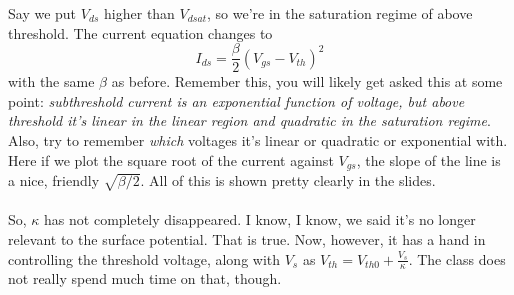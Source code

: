 \documentclass[main]{subfiles}
\begin{document}
Say we put $V_{ds}$ higher than $V_{dsat}$, so we're in the saturation regime of above threshold. The current equation changes to
\begin{equation}
I_{ds} = \frac{\beta}{2}(V_{gs} - V_{th})^2
\label{abvSatEqn}
\end{equation}
with the same $\beta$ as before. Remember this, you will likely get asked this at some point: \textsl{subthreshold current is an exponential function of voltage, but above threshold it's linear in the linear region and \emph{quadratic} in the saturation regime}. Also, try to remember \emph{which} voltages it's linear or quadratic or exponential with. Here if we plot the square root of the current against $V_{gs}$, the slope of the line is a nice, friendly $\sqrt{\beta/2}$. All of this is shown pretty clearly in the slides.\\ \\
So, $\kappa$ has not completely disappeared. I know, I know, we said it's no longer relevant to the surface potential. That is true. Now, however, it has a hand in controlling the threshold voltage, along with $V_s$ as $V_{th} = V_{th0} + \frac{V_s}{\kappa}$. The class does not really spend much time on that, though.
\end{document}
